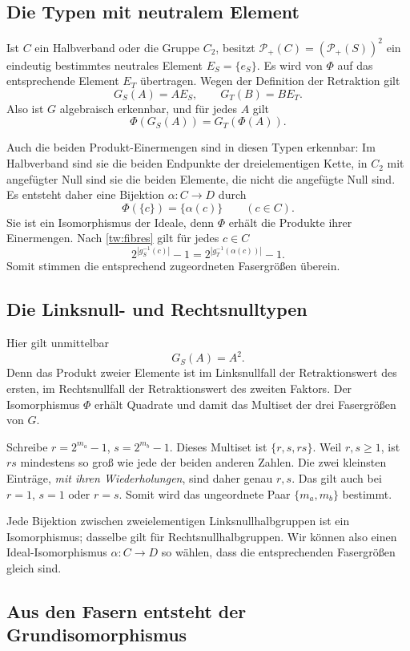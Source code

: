 \documentclass[a4paper,11pt]{article}
\newcommand{\Pp}[1]{\mathcal P_+(#1)}
\begin{document}
\subsection{Die Typen mit neutralem Element}

Ist \(C\) ein Halbverband oder die Gruppe \(C_2\), besitzt
\(\Pp C=(\Pp S)^2\) ein eindeutig bestimmtes neutrales Element
\(E_S=\{e_S\}\). Es wird von \(\Phi\) auf das entsprechende
Element \(E_T\) übertragen. Wegen der Definition der Retraktion gilt
\[
 G_S(A)=AE_S,\qquad G_T(B)=BE_T.
\]
Also ist \(G\) algebraisch erkennbar, und für jedes \(A\) gilt
\[
 \Phi(G_S(A))=G_T(\Phi(A)).
\]

Auch die beiden Produkt-Einermengen sind in diesen Typen erkennbar:
Im Halbverband sind sie die beiden Endpunkte der dreielementigen Kette,
in \(C_2\) mit angefügter Null sind sie die beiden Elemente, die nicht
die angefügte Null sind. Es entsteht daher eine Bijektion
\(\alpha:C\to D\) durch
\[
 \Phi(\{c\})=\{\alpha(c)\}\qquad(c\in C).
\]
Sie ist ein Isomorphismus der Ideale, denn \(\Phi\) erhält die
Produkte ihrer Einermengen. Nach \eqref{tw:fibres} gilt für jedes
\(c\in C\)
\[
 2^{|g_S^{-1}(c)|}-1
   =2^{|g_T^{-1}(\alpha(c))|}-1.
\]
Somit stimmen die entsprechend zugeordneten Fasergrößen überein.

\subsection{Die Linksnull- und Rechtsnulltypen}

Hier gilt unmittelbar
\[
 G_S(A)=A^2.
\]
Denn das Produkt zweier Elemente ist im Linksnullfall der
Retraktionswert des ersten, im Rechtsnullfall der Retraktionswert des
zweiten Faktors. Der Isomorphismus \(\Phi\) erhält Quadrate und damit
das Multiset der drei Fasergrößen von \(G\).

Schreibe \(r=2^{m_a}-1\), \(s=2^{m_b}-1\). Dieses Multiset ist
\(\{r,s,rs\}\). Weil \(r,s\ge1\), ist \(rs\) mindestens so groß
wie jede der beiden anderen Zahlen. Die zwei kleinsten Einträge,
\emph{mit ihren Wiederholungen}, sind daher genau \(r,s\). Das gilt
auch bei \(r=1\), \(s=1\) oder \(r=s\). Somit wird das ungeordnete
Paar \(\{m_a,m_b\}\) bestimmt.

Jede Bijektion zwischen zweielementigen Linksnullhalbgruppen ist ein
Isomorphismus; dasselbe gilt für Rechtsnullhalbgruppen. Wir können also
einen Ideal-Isomorphismus \(\alpha:C\to D\) so wählen, dass die
entsprechenden Fasergrößen gleich sind.

\subsection{Aus den Fasern entsteht der Grundisomorphismus}
\end{document}
